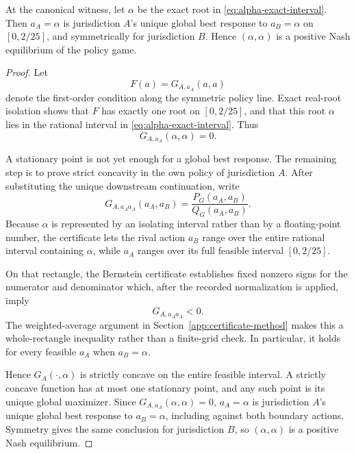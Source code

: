 \begin{lemma}\label{lem:local-global}
At the canonical witness, let $\alpha$ be the exact root in \eqref{eq:alpha-exact-interval}. Then $a_A=\alpha$ is jurisdiction $A$'s unique global best response to $a_B=\alpha$ on $[0,2/25]$, and symmetrically for jurisdiction $B$. Hence $(\alpha,\alpha)$ is a positive Nash equilibrium of the policy game.
\end{lemma}

\begin{proof}
Let
\[
F(a)=G_{A,a_A}(a,a)
\]
denote the first-order condition along the symmetric policy line. Exact real-root isolation shows that $F$ has exactly one root on $[0,2/25]$, and that this root $\alpha$ lies in the rational interval in \eqref{eq:alpha-exact-interval}. Thus
\[
G_{A,a_A}(\alpha,\alpha)=0.
\]

A stationary point is not yet enough for a global best response. The remaining step is to prove strict concavity in the own policy of jurisdiction $A$. After substituting the unique downstream continuation, write
\[
G_{A,a_Aa_A}(a_A,a_B)
=
\frac{P_G(a_A,a_B)}{Q_G(a_A,a_B)}.
\]
Because $\alpha$ is represented by an isolating interval rather than by a floating-point number, the certificate lets the rival action $a_B$ range over the entire rational interval containing $\alpha$, while $a_A$ ranges over its full feasible interval $[0,2/25]$.

On that rectangle, the Bernstein certificate establishes fixed nonzero signs for the numerator and denominator which, after the recorded normalization is applied, imply
\begin{equation}
G_{A,a_Aa_A}<0.
\end{equation}
The weighted-average argument in Section~\ref{app:certificate-method} makes this a whole-rectangle inequality rather than a finite-grid check. In particular, it holds for every feasible $a_A$ when $a_B=\alpha$.

Hence $G_A(\cdot,\alpha)$ is strictly concave on the entire feasible interval. A strictly concave function has at most one stationary point, and any such point is its unique global maximizer. Since $G_{A,a_A}(\alpha,\alpha)=0$, $a_A=\alpha$ is jurisdiction $A$'s unique global best response to $a_B=\alpha$, including against both boundary actions. Symmetry gives the same conclusion for jurisdiction $B$, so $(\alpha,\alpha)$ is a positive Nash equilibrium.
\end{proof}

